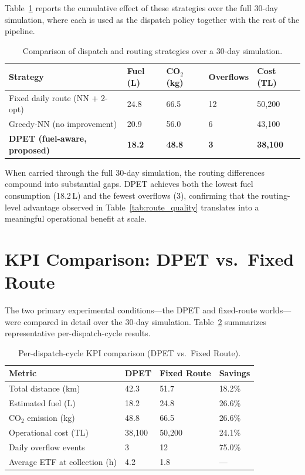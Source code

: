 \indent Table~\ref{tab:strategy_comparison} reports the cumulative effect of these strategies over the full 30-day simulation, where each is used as the dispatch policy together with the rest of the pipeline.

\begin{table}[H]
\centering
\caption{Comparison of dispatch and routing strategies over a 30-day simulation.}
\label{tab:strategy_comparison}
\begin{tabular}{lllll}
\toprule
\textbf{Strategy} & \textbf{Fuel (L)} & \textbf{CO$_2$ (kg)} & \textbf{Overflows} & \textbf{Cost (TL)} \\
\midrule
Fixed daily route (NN + 2-opt) & 24.8 & 66.5 & 12 & 50,200 \\
Greedy-NN (no improvement)     & 20.9 & 56.0 & 6  & 43,100 \\
\textbf{DPET (fuel-aware, proposed)} & \textbf{18.2} & \textbf{48.8} & \textbf{3} & \textbf{38,100} \\
\bottomrule
\end{tabular}
\end{table}

\indent When carried through the full 30-day simulation, the routing differences compound into substantial gaps. DPET achieves both the lowest fuel consumption (18.2\,L) and the fewest overflows (3), confirming that the routing-level advantage observed in Table~\ref{tab:route_quality} translates into a meaningful operational benefit at scale.

\section{KPI Comparison: DPET vs.\ Fixed Route}
\label{sec:kpi}

\indent The two primary experimental conditions---the DPET and fixed-route worlds---were compared in detail over the 30-day simulation. Table~\ref{tab:kpi} summarizes representative per-dispatch-cycle results.

\begin{table}[H]
\centering
\caption{Per-dispatch-cycle KPI comparison (DPET vs.\ Fixed Route).}
\label{tab:kpi}
\begin{tabular}{llll}
\toprule
\textbf{Metric} & \textbf{DPET} & \textbf{Fixed Route} & \textbf{Savings} \\
\midrule
Total distance (km)             & 42.3 & 51.7 & 18.2\% \\
Estimated fuel (L)              & 18.2 & 24.8 & 26.6\% \\
CO$_2$ emission (kg)            & 48.8 & 66.5 & 26.6\% \\
Operational cost (TL)           & 38,100 & 50,200 & 24.1\% \\
Daily overflow events           & 3    & 12   & 75.0\% \\
Average ETF at collection (h)   & 4.2  & 1.8  & --- \\
\bottomrule
\end{tabular}
\end{table}

